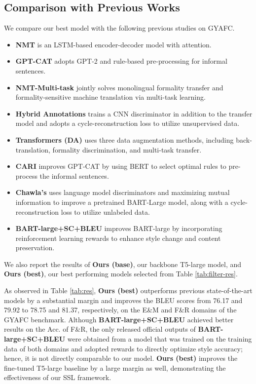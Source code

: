 \subsection{Comparison with Previous Works}
\label{sec:main}
We compare our best model with the following previous studies on GYAFC. 
\begin{itemize}
    \item \textbf{NMT} \citep{rao2018dear} is an LSTM-based encoder-decoder model with attention. 
    \item \textbf{GPT-CAT} \citep{harnessing} adopts GPT-2 and rule-based pre-processing for informal sentences. 
    \item \textbf{NMT-Multi-task} \citep{niu2018multi} jointly solves monolingual formality transfer and formality-sensitive machine translation via multi-task learning.
    \item \textbf{Hybrid Annotations} \citep{xu2019formality} trains a CNN discriminator in addition to the transfer model and adopts a cycle-reconstruction loss to utilize unsupervised data.
    \item \textbf{Transformers (DA)} \citep{zhang2020parallel} uses three data augmentation methods, including back-translation, formality discrimination, and multi-task transfer. 
    \item \textbf{CARI} \citep{cari} improves GPT-CAT by using BERT \citep{devlin2018bert} to select optimal rules to pre-process the informal sentences. 
    \item \textbf{Chawla's} \citep{chawla-yang-2020-semi} uses language model discriminators and maximizing mutual information to improve a pretrained BART-Large \citep{bart} model, along with a cycle-reconstruction loss to utilize unlabeled data.
    \item \textbf{BART-large+SC+BLEU} \citep{lai-etal-2021-thank} improves BART-large by incorporating reinforcement learning rewards to enhance style change and content preservation.
\end{itemize}
We also report the results of \textbf{Ours (base)}, our backbone T5-large model, and \textbf{Ours (best)}, our best performing models selected from Table \ref{tab:filter-res}. 

As observed in Table \ref{tab:res}, \textbf{Ours (best)} outperforms previous state-of-the-art models by a substantial margin and improves the BLEU scores from 76.17 and 79.92 to 78.75 and 81.37, respectively, on the E\&M and F\&R domains of the GYAFC benchmark. Although \textbf{BART-large+SC+BLEU} achieved better results on the Acc. of F\&R, the only released official outputs of \textbf{BART-large+SC+BLEU} were obtained from a model that was trained on the training data of both domains and adopted rewards to directly optimize style accuracy; hence, it is not directly comparable to our model. \textbf{Ours (best)} improves the fine-tuned T5-large baseline by a large margin as well, demonstrating the effectiveness of our SSL framework.

